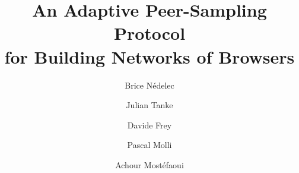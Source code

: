 \documentclass{class-for-drafts}
\begin{document}
\title{An Adaptive Peer-Sampling Protocol\\for Building Networks of Browsers}

\author{Brice N\'edelec \and Julian Tanke \and Davide Frey \and Pascal Molli
  \and Achour Most\'efaoui}


\maketitle









%



\clearpage
  
\end{document}
